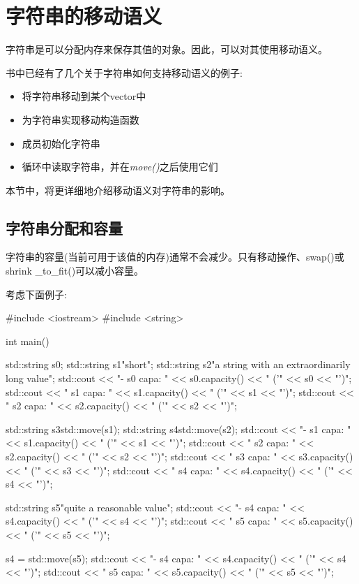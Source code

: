 \section{字符串的移动语义}
字符串是可以分配内存来保存其值的对象。因此，可以对其使用移动语义。

书中已经有了几个关于字符串如何支持移动语义的例子:

\begin{itemize}
	\item 将字符串移动到某个vector中
	\item 为字符串实现移动构造函数
	\item 成员初始化字符串
	\item 循环中读取字符串，并在\textit{move()}之后使用它们
\end{itemize}

本节中，将更详细地介绍移动语义对字符串的影响。

\subsection{字符串分配和容量}

字符串的容量(当前可用于该值的内存)通常不会减少。只有移动操作、swap()或shrink _to_fit()可以减小容量。

考虑下面例子:

\begin{cppcode}
#include <iostream>
#include <string>

int main()
{
	std::string s0;
	std::string s1{"short"};
	std::string s2{"a string with an extraordinarily long value"};
	std::cout << "- s0 capa: " << s0.capacity() << " ('" << s0 << "')\n";
	std::cout << " s1 capa: " << s1.capacity() << " ('" << s1 << "')\n";
	std::cout << " s2 capa: " << s2.capacity() << " ('" << s2 << "')\n";
	
	std::string s3{std::move(s1)};
	std::string s4{std::move(s2)};
	std::cout << "- s1 capa: " << s1.capacity() << " ('" << s1 << "')\n";
	std::cout << " s2 capa: " << s2.capacity() << " ('" << s2 << "')\n";
	std::cout << " s3 capa: " << s3.capacity() << " ('" << s3 << "')\n";
	std::cout << " s4 capa: " << s4.capacity() << " ('" << s4 << "')\n";
	
	std::string s5{"quite a reasonable value"};
	std::cout << "- s4 capa: " << s4.capacity() << " ('" << s4 << "')\n";
	std::cout << " s5 capa: " << s5.capacity() << " ('" << s5 << "')\n";
	
	s4 = std::move(s5);
	std::cout << "- s4 capa: " << s4.capacity() << " ('" << s4 << "')\n";
	std::cout << " s5 capa: " << s5.capacity() << " ('" << s5 << "')\n";
}
\end{cppcode}

